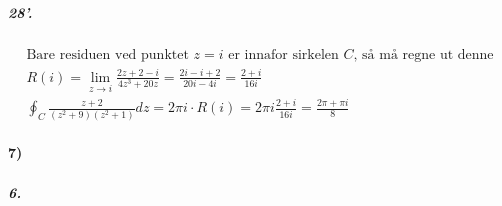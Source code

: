 \documentclass[11pt, A4paper,norsk]{article}
\begin{document}
			\subparagraph{28'.}
				\begin{gather*}
\text{Bare residuen ved punktet $z = i$ er innafor sirkelen $C$, så må regne ut denne} \\
R( i ) = \lim_{z \rightarrow i} \frac{2z + 2 - i}{4z^3 + 20z} = \frac{2i - i + 2}{20i - 4i} = \frac{2 + i}{16i} \\
\oint_C \frac{z + 2}{(z^2 + 9)(z^2 + 1)} dz = 2 \pi i \cdot R(i) = 2 \pi i \frac{2 + i}{16i} = \frac{2\pi + \pi i}{8}
				\end{gather*}









		\paragraph{7)}
			\subparagraph{6.}
\end{document}
